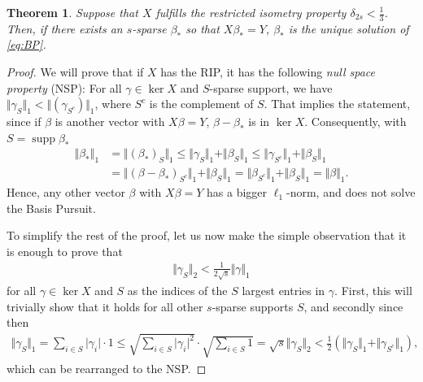 \documentclass{article}
\DeclareMathOperator{\supp}{\mathrm{supp}}
\newtheorem{theorem}{Theorem}
\newcommand{\abs}[1]{\vert #1 \vert}
\newcommand{\norm}[1]{\Vert #1 \Vert}
\begin{document}
\begin{theorem}
   Suppose that $X$ fulfills the restricted isometry property $\delta_{2s}<\tfrac{1}{3}$. Then, if there exists an $s$-sparse $\beta_*$ so that $X\beta_*=Y$, $\beta_*$ is the unique solution of \eqref{eq:BP}.
\end{theorem}
\begin{proof}
   We will prove that if $X$ has the RIP, it has the following \emph{null space property} (NSP): For all $\gamma \in \ker X$ and $S$-sparse support, we have $\norm{\gamma_S}_1<\norm{(\gamma_{S^c})}_1$, where $S^c$ is the complement of $S$. That implies the statement, since if $\beta$ is another vector with $X\beta = Y$, $\beta-\beta_*$ is in $\ker X$. Consequently, with $S=\supp \beta_*$
   \begin{align*}
       \norm{\beta_*}_1 &= \norm{(\beta_*)_S}_1 \leq \norm{\gamma_S}_1 + \norm{\beta_S}_1 \leq \norm{\gamma_{S^c}}_1 + \norm{\beta_S}_1 \\
       &= \norm{(\beta-\beta_*)_{S^c}}_1 + \norm{\beta_S}_1 = \norm{\beta_{S^c}}_1 + \norm{\beta_S}_1  = \norm{\beta}_1.
   \end{align*}
   Hence, any other vector $\beta$ with $X\beta=Y$ has a bigger $\ell_1$-norm, and does not solve the Basis Pursuit.

   To simplify the rest of the proof, let us now make the simple observation that it is enough to prove that 
   \begin{align*}
       \norm{\gamma_S}_2 < \frac{1}{2\sqrt{s}} \norm{\gamma}_1
   \end{align*}
   for all $\gamma \in \ker X$ and $S$ as the indices of the $S$ largest entries in $\gamma$. First, this will trivially show that it holds for all other $s$-sparse supports $S$, and secondly since then
   \begin{align*}
       \norm{\gamma_S}_1 = \sum_{i \in S} \abs{\gamma_i}\cdot 1 \leq \sqrt{\sum_{i \in S} \abs{\gamma_i}^2}\cdot \sqrt{\sum_{i \in S}1  } = \sqrt{s} \norm{\gamma_S}_2 < \frac{1}{2} ( \norm{\gamma_S}_1 + \norm{\gamma_{S^c}}_1),
   \end{align*}
   which can be rearranged to the NSP.


\end{proof}
\end{document}
